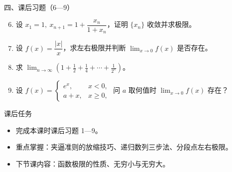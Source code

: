 \documentclass[aspectratio=169,11pt]{beamer}
\begin{document}
\begin{frame}{四、课后习题（6—9）}
\begin{enumerate}\setcounter{enumi}{5}
  \item 设 $x_1=1,\ x_{n+1}=1+\dfrac{x_n}{1+x_n}$，证明 $\{x_n\}$ 收敛并求极限。
  \item 设 $f(x)=\dfrac{|x|}{x}$，求左右极限并判断 $\displaystyle\lim_{x\to 0}f(x)$ 是否存在。
  \item 求 $\displaystyle\lim_{n\to\infty}\left(1+\frac12+\frac14+\cdots+\frac1{2^n}\right)$。
  \item 设 $f(x)=\begin{cases}e^x, & x<0,\\ a+x, & x\ge 0,\end{cases}$ 问 $a$ 取何值时 $\displaystyle\lim_{x\to 0}f(x)$ 存在？
\end{enumerate}
\end{frame}

\begin{frame}{课后任务}
\begin{itemize}
  \item 完成本课时课后习题 1—9。
  \item 重点掌握：夹逼准则的放缩技巧、递归数列三步法、分段点左右极限。
  \item 下节课内容：函数极限的性质、无穷小与无穷大。
\end{itemize}
\end{frame}
\end{document}
